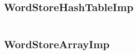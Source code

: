 \documentclass[12pt]{article}
\begin{document}
\FloatBarrier

\subsection{WordStoreHashTableImp}
\inputminted[mathescape,breaklines=true,fontsize=\footnotesize,baselinestretch=0.75,linenos=true]{java}{../src/main/java/com/ryanwelch/wordstore/WordStoreHashTableImp.java}

\clearpage

\subsection{WordStoreArrayImp}
\inputminted[mathescape,breaklines=true,fontsize=\footnotesize,baselinestretch=0.75,linenos=true]{java}{../src/main/java/com/ryanwelch/wordstore/WordStoreArrayImp.java}
\end{document}
